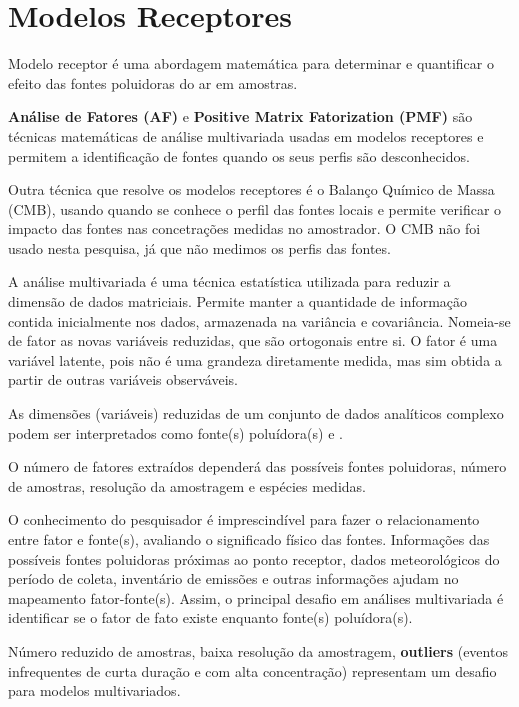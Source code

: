 \section{Modelos Receptores}

Modelo receptor é uma abordagem matemática para determinar e 
quantificar o efeito das fontes poluidoras do ar em amostras.

\textbf{Análise de Fatores (AF)} e 
\textbf{Positive Matrix Fatorization (PMF)} são técnicas matemáticas
de análise multivariada usadas em modelos receptores e 
permitem a identificação de fontes quando os seus perfis são desconhecidos.

Outra técnica que resolve os modelos receptores é 
o Balanço Químico de Massa (CMB), usando quando se conhece 
o perfil das fontes locais e permite verificar o impacto das fontes 
nas concetrações medidas no amostrador. 
O CMB não foi usado nesta pesquisa, já que não medimos os perfis 
das fontes. 

A análise multivariada é uma técnica estatística utilizada para 
reduzir a dimensão de dados matriciais. 
Permite manter a quantidade de informação contida inicialmente nos dados, 
armazenada na variância e covariância. 
Nomeia-se de fator as novas variáveis reduzidas, que são
ortogonais entre si. 
O fator é uma variável latente, pois não é uma grandeza diretamente
medida, mas sim obtida a partir de outras variáveis observáveis. 

As dimensões (variáveis) reduzidas de um conjunto de dados analíticos 
complexo podem ser interpretados como fonte(s) poluídora(s) 
\citep{wang2012} e \citep{mansha2012}.

O número de fatores extraídos dependerá das possíveis 
fontes poluidoras, número de amostras, resolução da amostragem 
e espécies medidas.

O conhecimento do pesquisador é imprescindível para fazer o relacionamento 
entre fator e fonte(s), avaliando o significado físico das fontes. 
Informações das possíveis fontes poluidoras próximas ao ponto 
receptor, dados meteorológicos do período de coleta, inventário de emissões 
e outras informações ajudam no mapeamento fator-fonte(s).
Assim, o principal desafio em análises multivariada é identificar 
se o fator de fato existe enquanto fonte(s) poluídora(s). 

Número reduzido de amostras, baixa resolução da amostragem, \textbf{outliers} 
(eventos infrequentes de curta duração e com alta concentração) representam 
um desafio para modelos multivariados.

